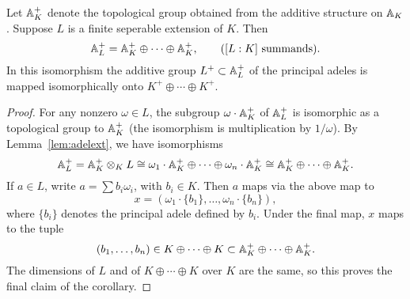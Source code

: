 \begin{corollary}\label{cor:addstruct}
Let $\AA_K^+$ denote the topological group obtained from the
additive structure on $\AA_K$.  Suppose $L$ is a finite seperable
extension of $K$.
 Then
$$
  \AA_L^+ = \AA_K^+ \oplus \cdots \oplus \AA_K^+,
\qquad ([L:K] \text{ summands}).
$$
In this isomorphism the additive group $L^+\subset \AA_L^+$ of the
principal adeles is mapped isomorphically onto $K^+\oplus \cdots
\oplus K^+$.
\end{corollary}
\begin{proof}
For any nonzero $\omega \in L$, the subgroup $\omega\cdot \AA_K^+$
of $\AA_L^+$ is isomorphic as a topological group to $\AA_K^+$
(the isomorphism is multiplication by $1/\omega$).  By
Lemma~\ref{lem:adelext}, we have isomorphisms
$$
\AA_L^+ = \AA_K^+ \tensor_K L
   \isom \omega_1\cdot \AA_K^+ \oplus \cdots \oplus \omega_n \cdot \AA_K^+
   \isom \AA_K^+ \oplus \cdots \oplus \AA_K^+.
$$
If $a \in L$, write $a=\sum b_i \omega_i$, with $b_i \in K$.
Then $a$ maps via the above map to
$$x = (\omega_1\cdot \{b_1\},\ldots, \omega_n \cdot \{b_n\}),$$
where $\{b_i\}$ denotes the principal adele defined by $b_i$.
Under the final map, $x$ maps to the tuple
$$(b_1,\ldots, b_n) \in K\oplus \cdots \oplus K \subset
\AA_K^+ \oplus \cdots \oplus \AA_K^+.$$
The dimensions of $L$ and of $K\oplus \cdots \oplus K$ over
$K$ are the same, so
this proves the final claim of the corollary.
\end{proof}

